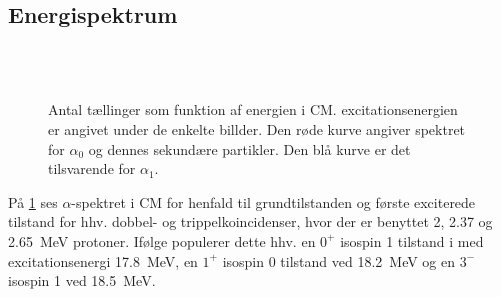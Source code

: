 \subsection{Energispektrum}
\label{sec:energispektrum}


\begin{figure}[h!]
  \centering
  \vspace{-0.3cm}
  \hfill
  \\
  \hfill
  \\
  \hfill
  \caption{Antal tællinger som funktion af energien i CM. \Carb excitationsenergien er angivet under de
    enkelte billder. Den røde kurve angiver spektret for $\alpha_{0}$ og dennes sekundære partikler. Den
    blå kurve er det tilsvarende for $\alpha_{1}$.}
  \label{fig:alpha-spec}
  \vspace{-1.3cm}
\end{figure}

På \cref{fig:alpha-spec} ses $\alpha$-spektret i CM for henfald til grundtilstanden og første exciterede
tilstand for hhv. dobbel- og trippelkoincidenser, hvor der er benyttet 2, \num{2.37} og
\SI{2.65}{\MeV} protoner. Ifølge \cite{States} populerer dette hhv.  en $0^{+}$ isospin 1 tilstand i
\Carb med excitationsenergi \SI{17.8}{\MeV}, en $1^{+}$ isospin 0 tilstand ved \SI{18.2}{\MeV} og en
$3^{-}$ isospin 1 ved \SI{18.5}{\MeV}.

